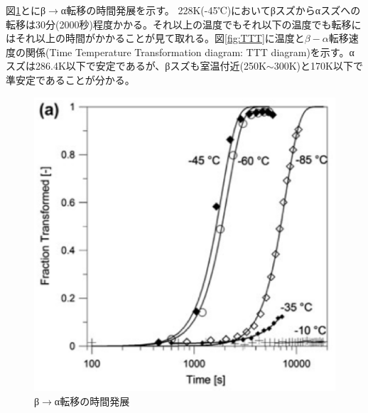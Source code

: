図\ref{fig:beta-to-alpha}とにβ$\to$α転移の時間発展を示す\cite{Nogita}。
228K(-45℃)においてβスズからαスズへの転移は30分(2000秒)程度かかる。それ以上の温度でもそれ以下の温度でも転移にはそれ以上の時間がかかることが見て取れる。図\ref{fig:TTT}に温度と$\beta-\alpha$転移速度の関係(Time Temperature Transformation diagram: TTT diagram)を示す。αスズは286.4K以下で安定であるが、βスズも室温付近(250K$\sim$300K)と170K以下で準安定であることが分かる。
\begin{figure}[!h]
 \begin{minipage}{0.5\hsize}
    \begin{center}
   \includegraphics[width=\hsize]{Introduction/beta-to-alpha.eps}
  \end{center}
  \caption{β$\to$α転移の時間発展}
  \label{fig:beta-to-alpha}
 \end{minipage}
  \begin{minipage}{0.5\hsize}
     \begin{center}

\end{center}
\end{minipage}
\end{figure}
